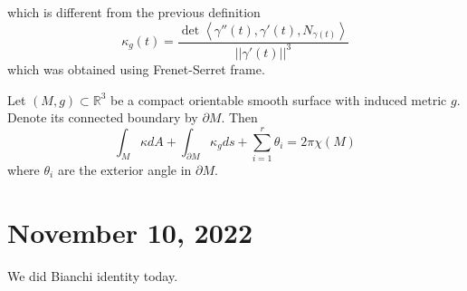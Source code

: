 \documentclass[12pt,a4paper]{article}
\theoremstyle{definition}
\theoremstyle{greenbox}
\newcommand{\R}{\mathbb{R}}
\begin{document}
    which is different from the previous definition 
    \[ \kappa_{g}(t) = \frac{\det \left< \gamma''(t), \gamma'(t), N_{\gamma(t)} \right>}{||\gamma'(t)||^{3}} \]
    which was obtained using Frenet-Serret frame.

    \begin{thm}
        Let $ (M,g)  \subset \R^{3}$ be a compact orientable smooth surface with induced metric $ g $. Denote its connected boundary  by $ \partial M $. Then 
        \[ \int_{M}\kappa dA + \int_{ \partial M} \kappa_{g}ds + \sum_{i=1}^{r} \theta_{i}  = 2 \pi \chi(M)\]
        where $ \theta_{i} $ are the exterior angle in $ \partial M $.
    \end{thm}

    \section{November 10, 2022}

     We did Bianchi identity today. 
\end{document}

